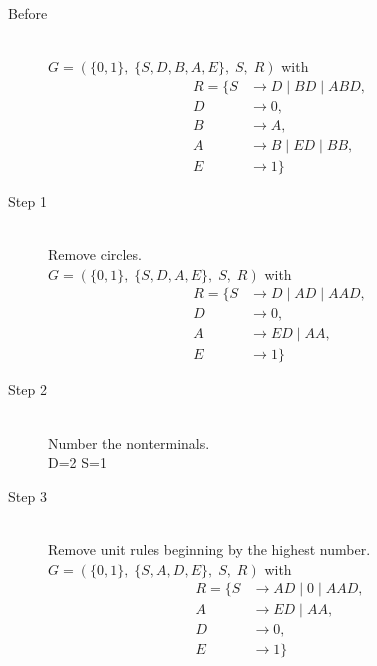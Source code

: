 \begin{description}
	\item[Before] \hfill \\ 
		$G=(\{	0, 1\},\;\{ S, D, B, A, E\},\;S,\;R)$ with
	\begin{align*}
		R=\{	S &\rightarrow D\;|\;BD\;|\;ABD, \\ 
		D &\rightarrow 0, \\ 
		B &\rightarrow A, \\ 
		A &\rightarrow B\;|\;ED\;|\;BB, \\ 
		E &\rightarrow 1\}
	\end{align*}
	\item[Step 1] \hfill \\ 
	Remove circles.\\ 
	$G=(\{	0, 1\},\;\{ S, D, A, E\},\;S,\;R)$ with
	\begin{align*}
		R=\{	S &\rightarrow D\;|\;AD\;|\;AAD, \\ 
		D &\rightarrow 0, \\ 
		A &\rightarrow ED\;|\;AA, \\ 
		E &\rightarrow 1\}
	\end{align*}
	\item[Step 2] \hfill \\ 
	Number the nonterminals.\\ 
	D=2 S=1 
	\item[Step 3] \hfill \\ 
	Remove unit rules beginning by the highest number.\\ 
	$G=(\{	0, 1\},\;\{ S, A, D, E\},\;S,\;R)$ with
	\begin{align*}
		R=\{	S &\rightarrow AD\;|\;0\;|\;AAD, \\ 
		A &\rightarrow ED\;|\;AA, \\ 
		D &\rightarrow 0, \\ 
		E &\rightarrow 1\}
	\end{align*}
\end{description}